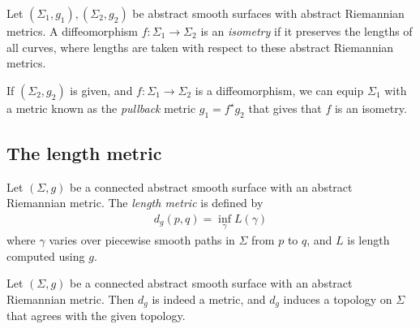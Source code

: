 \begin{definition}
	Let $(\Sigma_1, g_1), (\Sigma_2, g_2)$ be abstract smooth surfaces with abstract Riemannian metrics.
	A diffeomorphism $f \colon \Sigma_1 \to \Sigma_2$ is an \textit{isometry} if it preserves the lengths of all curves, where lengths are taken with respect to these abstract Riemannian metrics.
\end{definition}
\begin{example}
	If $(\Sigma_2, g_2)$ is given, and $f \colon \Sigma_1 \to \Sigma_2$ is a diffeomorphism, we can equip $\Sigma_1$ with a metric known as the \textit{pullback} metric $g_1 = f^\star g_2$ that gives that $f$ is an isometry.
\end{example}

\subsection{The length metric}
\begin{definition}
	Let $(\Sigma, g)$ be a connected abstract smooth surface with an abstract Riemannian metric.
	The \textit{length metric} is defined by
	\begin{align*}
		d_g(p,q) = \inf_\gamma L(\gamma)
	\end{align*}
	where $\gamma$ varies over piecewise smooth paths in $\Sigma$ from $p$ to $q$, and $L$ is length computed using $g$.
\end{definition}
\begin{proposition}
	Let $(\Sigma, g)$ be a connected abstract smooth surface with an abstract Riemannian metric.
	Then $d_g$ is indeed a metric, and $d_g$ induces a topology on $\Sigma$ that agrees with the given topology.
\end{proposition}
